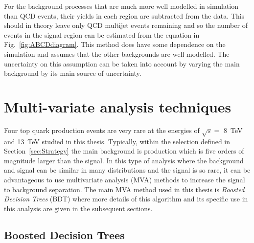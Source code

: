 For the background processes that are much more well modelled in simulation than QCD events, their yields in each region are subtracted from the data. This should in theory leave only QCD multijet events remaining and so the number of events in the signal region can be estimated from the equation in Fig.~\ref{fig:ABCDdiagram}. This method does have some dependence on the simulation and assumes that the other backgrounds are well modelled. The uncertainty on this assumption can be taken into account by varying the main \ttbar background by its main source of uncertainty. 


\section{Multi-variate analysis techniques ~\label{sec:MVAtechniques}}

Four top quark production events are very rare at the energies of $\sqrt{s} = $ 8~TeV and 13~TeV studied in this thesis. Typically, within the selection defined in Section~\ref{sec:Strategy} the main background is \ttbar production which is five orders of magnitude larger than the \tttt signal. In this type of analysis where the background and signal can be similar in many distributions and the signal is so rare, it can be advantageous to use multivariate analysis (MVA) methods to increase the signal to background separation. The main MVA method used in this thesis is \emph{Boosted Decision Trees} (BDT) where more details of this algorithm and its specific use in this analysis are given in the subsequent sections.


\subsection{Boosted Decision Trees}
\label{sec:BDT}

